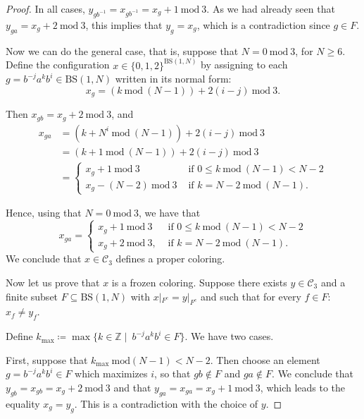 \documentclass[letterpaper,11pt,reqno]{amsart}
\theoremstyle{plain}
\theoremstyle{definition}
\newcommand{\BS}[1][N]{\mathrm{BS}(1,#1)}
\begin{document}
\begin{proof}
	In all cases, $y_{gb^{-1}}=x_{gb^{-1}}=x_{g}+1\ \mathrm{mod} \ 3$. As we had already seen that $y_{ga}=x_{g}+2\ \mathrm{mod}\ 3$, this implies that $y_g=x_g$, which is a contradiction since $g\in F$.
	
	
	
	Now we can do the general case, that is, suppose that $N=0 \ \mathrm{mod} \ 3$, for $N \ge 6$. Define the configuration $x\in \{0,1,2\}^{\BS}$ by assigning to each $g=b^{-j}a^kb^{i}\in \BS$ written in its normal form:
	$$
	x_g=(k\ \mathrm{mod}\ (N-1))+ 2(i-j)\ \mathrm{mod}\  3.
	$$ 
	
	Then $x_{gb}=x_g+2 \ \mathrm{mod} \ 3$, and
	\begin{align*}
	x_{ga}&=(k+N^i \ \mathrm{mod}\ (N-1))+2(i-j)\ \mathrm{mod}\ 3\\
	&=(k+1 \ \mathrm{mod}\ (N-1))+2(i-j)\ \mathrm{mod}\ 3\\
	&=\left\{
	\begin{aligned}
	x_g+1 \ \mathrm{mod}\ 3 &\text{ if } 0\le k\ \mathrm{mod}\ (N-1) <N-2\\
	x_g-(N-2) \ \mathrm{mod}\ 3 &\text{ if }  k=N-2 \ \mathrm{mod}\ (N-1).
	\end{aligned}
	\right.
	\end{align*}	
	
	Hence, using that $N=0\ \mathrm{mod}\ 3$, we have that
	$$
	x_{ga}=\begin{cases}
	x_g+1 \ \mathrm{mod} \ 3&\text{ if } 0\le k\ \mathrm{mod}\ (N-1) <N-2\\
	x_{g}+2 \ \mathrm{mod} \ 3, &\text{ if }k=N-2 \ \mathrm{mod}\ (N-1).
	\end{cases}
	$$	
	We conclude that $x\in \mathcal{C}_3$ defines a proper coloring.
	
	Now let us prove that $x$ is a frozen coloring. Suppose there exists $y\in \mathcal{C}_3$ and a finite subset $F\subseteq\BS$ with $x|_{F^{c}}=y|_{F^c}$ and such that for every $f\in F$: $x_f\neq y_f$.
	
	Define $k_{\mathrm{max}}\coloneqq \max\{k\in \mathbb{Z}\mid \ b^{-j}a^kb^i\in F \}$. We have two cases.
	
	First, suppose that $k_{\mathrm{max}} \ \mathrm{mod} (N-1)<N-2$. Then choose an element $g=b^{-j}a^kb^i\in F$ which maximizes $i$, so that $gb\notin F$ and $ga\notin F$. We conclude that $y_{gb}=x_{gb}=x_g+2\ \mathrm{mod}\ 3$ and that $y_{ga}=x_{ga}=x_g+1\ \mathrm{mod}\ 3$, which leads to the  equality $x_g=y_g$. This is a contradiction with the choice of $y$.
	

\end{proof}
\end{document}
